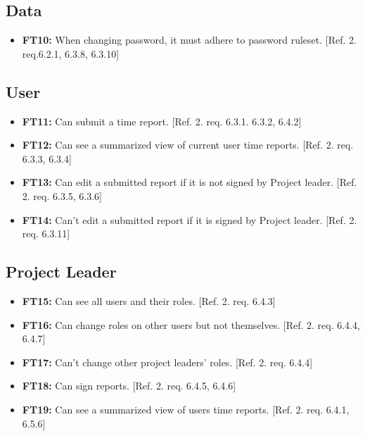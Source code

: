 \documentclass{article}
\begin{document}
		\subsection{Data}
		
		\begin{itemize}
		
  			\item \textbf{FT10:}  When changing password, it must adhere to password ruleset. [Ref. 2. req.6.2.1, 6.3.8, 6.3.10]

		\end{itemize}
		
		\subsection{User}
		
		\begin{itemize}
  			\item \textbf{FT11:} Can submit a time report. [Ref. 2. req. 6.3.1. 6.3.2, 6.4.2]
  			
  			\item \textbf{FT12:} Can see a summarized view of current user time reports. [Ref. 2. req. 6.3.3, 6.3.4]
  			
  			\item \textbf{FT13:} Can edit a submitted report if it is not signed by Project leader. [Ref. 2. req. 6.3.5, 6.3.6]
  			
  			 \item \textbf{FT14:} Can't edit a submitted report if it is signed by Project leader. [Ref. 2. req. 6.3.11]


		\end{itemize}
		
		\subsection{Project Leader}
		
			\begin{itemize}
  			\item \textbf{FT15:} Can see all users and their roles. [Ref. 2. req. 6.4.3]

  			\item \textbf{FT16:} Can change roles on other users but not themselves. [Ref. 2. req. 6.4.4, 6.4.7]
  			
  			\item \textbf{FT17:} Can’t change other project leaders' roles. [Ref. 2. req. 6.4.4]
  			
  			\item \textbf{FT18:} Can sign reports. [Ref. 2. req. 6.4.5, 6.4.6]

  			\item \textbf{FT19:} Can see a summarized view of users time reports. [Ref. 2. req. 6.4.1, 6.5.6]

		\end{itemize}
		
\end{document}
